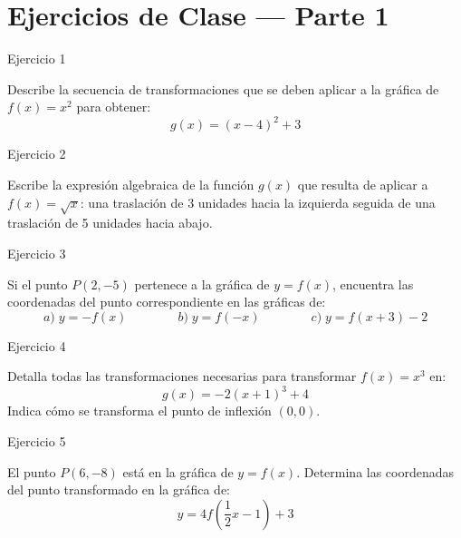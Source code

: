 \documentclass[aspectratio=169]{beamer}
\begin{document}
\section{Ejercicios de Clase — Parte 1}

\begin{frame}{Ejercicio 1}
  \begin{mwejercicio}
    Describe la secuencia de transformaciones que se deben aplicar a la gráfica de $f(x) = x^2$ para obtener:
    $$g(x) = (x - 4)^2 + 3$$
  \end{mwejercicio}
  \vspace{3.5cm}
\end{frame}
\begin{frame}{Ejercicio 2}
  \begin{mwejercicio}
    Escribe la expresión algebraica de la función $g(x)$ que resulta de aplicar a $f(x) = \sqrt{x}$: una traslación de 3 unidades hacia la izquierda seguida de una traslación de 5 unidades hacia abajo.
  \end{mwejercicio}
  \vspace{3.5cm}
\end{frame}
\begin{frame}{Ejercicio 3}
  \begin{mwejercicio}
    Si el punto $P(2, -5)$ pertenece a la gráfica de $y = f(x)$, encuentra las coordenadas del punto correspondiente en las gráficas de:
    $$a)\; y = -f(x) \qquad\qquad b)\; y = f(-x) \qquad\qquad c)\; y = f(x + 3) - 2$$
  \end{mwejercicio}
  \vspace{3.5cm}
\end{frame}
\begin{frame}{Ejercicio 4}
  \begin{mwejercicio}
    Detalla todas las transformaciones necesarias para transformar $f(x) = x^3$ en:
    $$g(x) = -2(x + 1)^3 + 4$$
    Indica cómo se transforma el punto de inflexión $(0,0)$.
  \end{mwejercicio}
  \vspace{3.5cm}
\end{frame}
\begin{frame}{Ejercicio 5}
  \begin{mwejercicio}
    El punto $P(6, -8)$ está en la gráfica de $y = f(x)$. Determina las coordenadas del punto transformado en la gráfica de:
    $$y = 4 f\left(\frac{1}{2}x - 1\right) + 3$$
  \end{mwejercicio}
  \vspace{3.5cm}
\end{frame}
\end{document}
